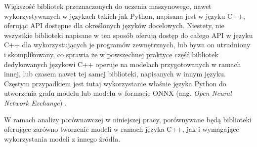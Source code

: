 Większość bibliotek przeznaczonych do uczenia maszynowego, nawet wykorzystywanych w językach takich jak Python, napisana jest w języku C++, oferując API dostępne dla określonych języków docelowych. Niestety, nie wszystkie biblioteki napisane w ten sposób oferują dostęp do całego API w języku C++ dla wykorzystujących je programów zewnętrznych, lub bywa on utrudniony i skomplikowany, co sprawia że w powszechnej praktyce część bibliotek dedykowanych językowi C++ operuje na modelach przygotowanych w ramach innej, lub czasem nawet tej samej biblioteki, napisanych w innym języku. Częstym przypadkiem jest tutaj wykorzystanie właśnie języka Python do utworzenia grafu modelu lub modelu w formacie ONNX (ang. \textit{Open Neural Network Exchange}) \cite{cpp_onnx}. 

W ramach analizy porównawczej w niniejszej pracy, porównywane będą biblioteki oferujące zarówno tworzenie modeli w ramach języka C++, jak i wymagające wykorzystania modeli z innego źródła. 